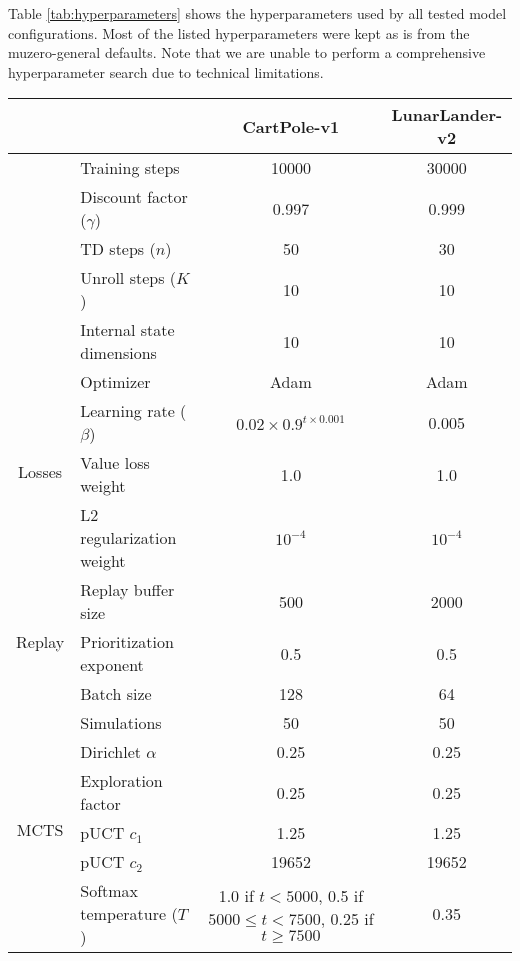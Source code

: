 Table \ref{tab:hyperparameters} shows the hyperparameters used by all tested model configurations. Most of the listed hyperparameters were kept as is from the muzero-general defaults. Note that we are unable to perform a comprehensive hyperparameter search due to technical limitations.
\begin{table}[ht]
    \centering
    \begin{tabular}{|c|l||c|c|}
        \hline
        & & CartPole-v1 & LunarLander-v2 \\
        \hline\hline

        & Training steps & 10000 & 30000 \\
        \cline{2-4}
        & Discount factor ($\gamma$) & 0.997 & 0.999 \\
        \cline{2-4}
        & TD steps ($n$) & 50 & 30 \\
        \cline{2-4}
        & Unroll steps ($K$) & 10 & 10 \\
        \cline{2-4}
        & Internal state dimensions & 10 & 10 \\

        \hline

        \multirow{4}{*}{\begin{sideways}Losses\end{sideways}} & Optimizer & Adam & Adam \\
        \cline{2-4}
        & Learning rate ($\beta$) & $0.02 \times 0.9^{t \times 0.001}$ & 0.005 \\
        \cline{2-4}
        & Value loss weight & 1.0 & 1.0 \\
        \cline{2-4}
        & L2 regularization weight & $10^{-4}$ & $10^{-4}$ \\

        \hline

        \multirow{3}{*}{\begin{sideways}Replay\end{sideways}} & Replay buffer size & 500 & 2000 \\
        \cline{2-4}
        & Prioritization exponent & 0.5 & 0.5 \\
        \cline{2-4}
        & Batch size & 128 & 64 \\

        \hline

        \multirow{8}{*}{\begin{sideways}MCTS\end{sideways}} & Simulations & 50 & 50 \\
        \cline{2-4}
        & Dirichlet $\alpha$ & 0.25 & 0.25 \\
        \cline{2-4}
        & Exploration factor & 0.25 & 0.25 \\
        \cline{2-4}
        & pUCT $c_1$ & 1.25 & 1.25 \\
        \cline{2-4}
        & pUCT $c_2$ & 19652 & 19652 \\
        \cline{2-4}
        & Softmax temperature ($T$) & \makecell{
            1.0 if $t<5000$, \\ 0.5 if $5000 \leq t < 7500$, \\ 0.25 if $t \geq 7500$
        } & 0.35 \\


\end{tabular}
\end{table}
